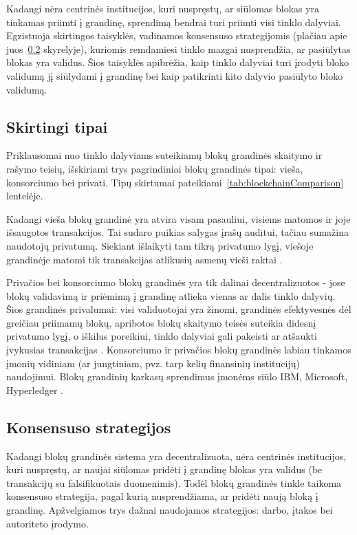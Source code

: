 Kadangi nėra centrinės institucijos, kuri nuspręstų, ar siūlomas blokas yra tinkamas priimti į grandinę, sprendimą bendrai turi priimti
visi tinklo dalyviai. Egzistuoja skirtingos taisyklės, vadinamos konsensuso strategijomis (plačiau apie juos~\ref{blockchain:consensus} skyrelyje), kuriomis
remdamiesi tinklo mazgai nusprendžia, ar pasiūlytas blokas yra validus. Šios taisyklės apibrėžia, kaip tinklo dalyviai turi įrodyti bloko validumą jį siūlydami į grandinę
bei kaip patikrinti kito dalyvio pasiūlyto bloko validumą.

\subsection{Skirtingi tipai}

Priklausomai nuo tinklo dalyviams suteikiamų blokų grandinės skaitymo ir rašymo teisių,
išskiriami trys pagrindiniai blokų grandinės tipai: vieša, konsorciumo bei privati.  Tipų skirtumai pateikiami~\ref{tab:blockchainComparison} lentelėje.



Kadangi vieša blokų grandinė yra atvira visam pasauliui, visiems matomos ir joje išsaugotos transakcijos. Tai sudaro puikias salygas įrašų
auditui, tačiau sumažina naudotojų privatumą. Siekiant išlaikyti tam tikrą privatumo lygį, viešoje grandinėje matomi tik transakcijas atlikusių 
asmenų vieši raktai \cite{SatoshiNakamoto}.

Privačios bei konsorciumo blokų grandinės yra tik dalinai decentralizuotos - jose blokų validavimą ir priėmimą į grandinę atlieka vienas
ar dalis tinklo dalyvių. Šios grandinės privalumai: visi validuotojai yra žinomi, grandinės efektyvesnės dėl greičiau priimamų blokų, apribotos blokų skaitymo teisės suteikia didesnį
privatumo lygį, o iškilus poreikiui, tinklo dalyviai gali pakeisti ar atšaukti įvykusias transakcijas \cite{Buterin2015}. Konsorciumo ir privačios blokų grandinės labiau tinkamos įmonių vidiniam (ar jungtiniam,
pvz. tarp kelių finansinių institucijų) naudojimui. Blokų grandinių karkasų sprendimus įmonėms siūlo IBM, Microsoft, Hyperledger \cite{Zheng2017}.

\subsection{Konsensuso strategijos} \label{blockchain:consensus}

Kadangi blokų grandinės sistema yra decentralizuota, nėra centrinės institucijos, kuri nuspręstų, ar naujai siūlomas pridėti į grandinę blokas
yra validus (be transakcijų su falsifikuotais duomenimis). Todėl blokų grandinės tinkle taikoma konsensuso strategija,
pagal kurią nusprendžiama, ar pridėti naują bloką į grandinę. Apžvelgiamos trys dažnai naudojamos strategijos: darbo, įtakos bei autoriteto įrodymo.

